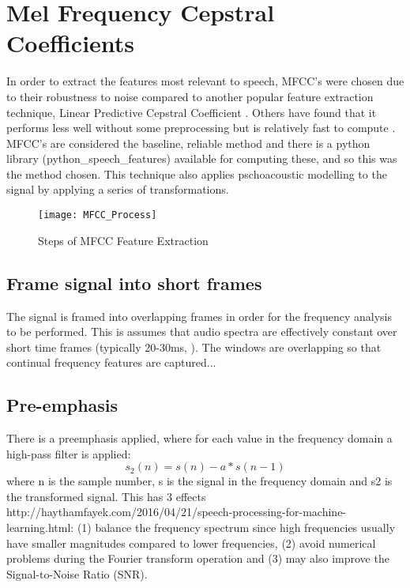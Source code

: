 
\section{Mel Frequency Cepstral Coefficients}

In order to extract the features most relevant to speech, MFCC’s were chosen due to their robustness to noise compared to another popular feature extraction technique, Linear Predictive Cepstral Coefficient \cite{lpccvsmfcc}. Others have found that it performs less well without some preprocessing but is relatively fast to compute \cite{Shrawankar2013}. MFCC’s are considered the baseline, reliable method and there is a python library (python\_speech\_features) available for computing these, and so this was the method chosen.
This technique also applies pschoacoustic modelling to the signal by applying a series of transformations. 

\begin{figure}[h]
	\texttt{[image: MFCC\_Process]}
	\caption{Steps of MFCC Feature Extraction \cite{mfcc_steps}}
	\label{mfcc}
\end{figure}

\subsection{Frame signal into short frames}
The signal is framed into overlapping frames in order for the frequency analysis to be performed. This is assumes that audio spectra are effectively constant over short time frames (typically 20-30ms, ). The windows are overlapping so that continual frequency features are captured...

\subsection{Pre-emphasis}
There is a preemphasis applied, where for each value in the frequency domain a high-pass filter is applied:
\begin{equation}
s_{2}(n) = s(n) - a*s(n-1) 
\end{equation}
where n is the sample number, s is the signal in the frequency domain and s2 is the transformed signal. 
This has 3 effects http://haythamfayek.com/2016/04/21/speech-processing-for-machine-learning.html:
(1) balance the frequency spectrum since high frequencies usually have smaller magnitudes compared to lower frequencies,
(2) avoid numerical problems during the Fourier transform operation and
(3) may also improve the Signal-to-Noise Ratio (SNR).

